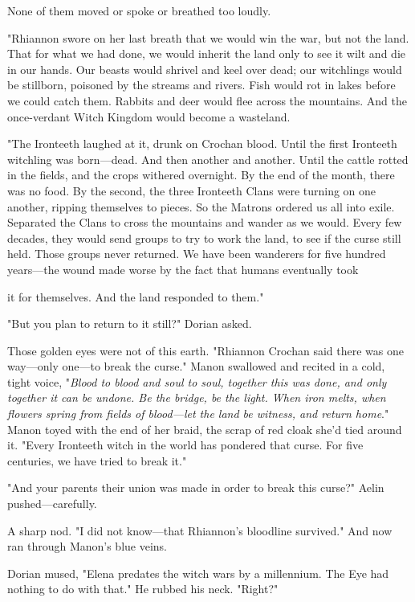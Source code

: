 None of them moved or spoke or breathed too loudly.

"Rhiannon swore on her last breath that we would win the war, but not the land. That for what we had done, we would inherit the land only to see it wilt and die in our hands. Our beasts would shrivel and keel over dead; our witchlings would be stillborn, poisoned by the streams and rivers. Fish would rot in lakes before we could catch them. Rabbits and deer would flee across the mountains. And the once-verdant Witch Kingdom would become a wasteland.

"The Ironteeth laughed at it, drunk on Crochan blood. Until the first Ironteeth witchling was born---dead. And then another and another. Until the cattle rotted in the fields, and the crops withered overnight. By the end of the month, there was no food. By the second, the three Ironteeth Clans were turning on one another, ripping themselves to pieces. So the Matrons ordered us all into exile. Separated the Clans to cross the mountains and wander as we would. Every few decades, they would send groups to try to work the land, to see if the curse still held. Those groups never returned. We have been wanderers for five hundred years---the wound made worse by the fact that humans eventually took

it for themselves. And the land responded to them."

"But you plan to return to it still?" Dorian asked.

Those golden eyes were not of this earth. "Rhiannon Crochan said there was one way---only one---to break the curse." Manon swallowed and recited in a cold, tight voice, "\emph{Blood to blood and soul to soul, together this was done, and only together it can be undone. Be the bridge, be the light. When iron melts, when flowers spring from fields of blood---let the land be witness, and return home}." Manon toyed with the end of her braid, the scrap of red cloak she'd tied around it. "Every Ironteeth witch in the world has pondered that curse. For five centuries, we have tried to break it."

"And your parents  their union was made in order to break this curse?" Aelin pushed---carefully.

A sharp nod. "I did not know---that Rhiannon's bloodline survived." And now ran through Manon's blue veins.

Dorian mused, "Elena predates the witch wars by a millennium. The Eye had nothing to do with that." He rubbed his neck. "Right?"

